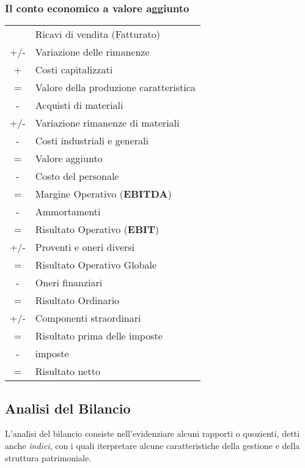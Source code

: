 \documentclass[a4paper,portrait,12pt]{article}
\theoremstyle{definition}
\begin{document}
\subsubsection{Il conto economico a valore aggiunto}

\begin{table}[H]
\begin{center}
\begin{tabular}{cl}
& Ricavi di vendita (Fatturato)\\
+/- & Variazione delle rimanenze\\
+ & Costi capitalizzati\\
= & Valore della produzione caratteristica\\
\hline
- & Acquisti di materiali\\
+/- & Variazione rimanenze di materiali\\
- & Costi industriali e generali\\
= & Valore aggiunto\\
\hline
- & Costo del personale\\
= & Margine Operativo (\textbf{EBITDA})\\
\hline
- & Ammortamenti\\
= & Risultato Operativo (\textbf{EBIT})\\
\hline
+/- & Proventi e oneri diversi\\
= & Risultato Operativo Globale\\
\hline
- & Oneri finanziari\\
= & Risultato Ordinario\\
\hline
+/- & Componenti straordinari\\
= & Risultato prima delle imposte\\
\hline
- & imposte\\
= & Risultato netto
\end{tabular}
\end{center}
\end{table}

\subsection{Analisi del Bilancio}

L'analisi del bilancio consiste nell'evidenziare alcuni rapporti o quozienti, detti anche \emph{indici}, con i quali iterpretare alcune caratteristiche della gestione e della struttura patrimoniale.
\end{document}
